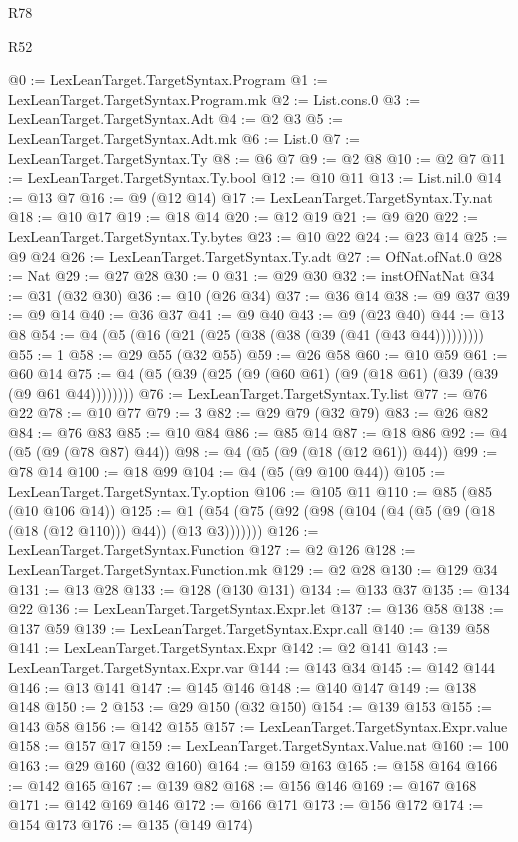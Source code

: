 \begin{lexlean}{R78}
\begin{lexlean}{R52}
\begin{coremodule}
{{{{{{{{{{{{{{{{{{{{{{{{{{{{{{{{{{{{{{{{{{{{{{{{{{{{{{{{{{{{{{{{{{{{{{{{{{{{{{{{{{{{{{{{{{{{{{{{{{{{{{{{{{{{{{{{{{{{{{{{{{{{{{{{{{{{{{{{{{{{{{{{{{{{{{{{{{{{{{{{{{{{{{{{{{{{{{{{{{{{{{{{{{{{{{{{{{{{{{@0 := LexLeanTarget.TargetSyntax.Program
@1 := LexLeanTarget.TargetSyntax.Program.mk
@2 := List.cons.{0}
@3 := LexLeanTarget.TargetSyntax.Adt
@4 := @2 @3
@5 := LexLeanTarget.TargetSyntax.Adt.mk
@6 := List.{0}
@7 := LexLeanTarget.TargetSyntax.Ty
@8 := @6 @7
@9 := @2 @8
@10 := @2 @7
@11 := LexLeanTarget.TargetSyntax.Ty.bool
@12 := @10 @11
@13 := List.nil.{0}
@14 := @13 @7
@16 := @9 (@12 @14)
@17 := LexLeanTarget.TargetSyntax.Ty.nat
@18 := @10 @17
@19 := @18 @14
@20 := @12 @19
@21 := @9 @20
@22 := LexLeanTarget.TargetSyntax.Ty.bytes
@23 := @10 @22
@24 := @23 @14
@25 := @9 @24
@26 := LexLeanTarget.TargetSyntax.Ty.adt
@27 := OfNat.ofNat.{0}
@28 := Nat
@29 := @27 @28
@30 := 0
@31 := @29 @30
@32 := instOfNatNat
@34 := @31 (@32 @30)
@36 := @10 (@26 @34)
@37 := @36 @14
@38 := @9 @37
@39 := @9 @14
@40 := @36 @37
@41 := @9 @40
@43 := @9 (@23 @40)
@44 := @13 @8
@54 := @4 (@5 (@16 (@21 (@25 (@38 (@38 (@39 (@41 (@43 @44)))))))))
@55 := 1
@58 := @29 @55 (@32 @55)
@59 := @26 @58
@60 := @10 @59
@61 := @60 @14
@75 := @4 (@5 (@39 (@25 (@9 (@60 @61) (@9 (@18 @61) (@39 (@39 (@9 @61 @44))))))))
@76 := LexLeanTarget.TargetSyntax.Ty.list
@77 := @76 @22
@78 := @10 @77
@79 := 3
@82 := @29 @79 (@32 @79)
@83 := @26 @82
@84 := @76 @83
@85 := @10 @84
@86 := @85 @14
@87 := @18 @86
@92 := @4 (@5 (@9 (@78 @87) @44))
@98 := @4 (@5 (@9 (@18 (@12 @61)) @44))
@99 := @78 @14
@100 := @18 @99
@104 := @4 (@5 (@9 @100 @44))
@105 := LexLeanTarget.TargetSyntax.Ty.option
@106 := @105 @11
@110 := @85 (@85 (@10 @106 @14))
@125 := @1 (@54 (@75 (@92 (@98 (@104 (@4 (@5 (@9 (@18 (@18 (@12 @110))) @44)) (@13 @3)))))))
@126 := LexLeanTarget.TargetSyntax.Function
@127 := @2 @126
@128 := LexLeanTarget.TargetSyntax.Function.mk
@129 := @2 @28
@130 := @129 @34
@131 := @13 @28
@133 := @128 (@130 @131)
@134 := @133 @37
@135 := @134 @22
@136 := LexLeanTarget.TargetSyntax.Expr.let
@137 := @136 @58
@138 := @137 @59
@139 := LexLeanTarget.TargetSyntax.Expr.call
@140 := @139 @58
@141 := LexLeanTarget.TargetSyntax.Expr
@142 := @2 @141
@143 := LexLeanTarget.TargetSyntax.Expr.var
@144 := @143 @34
@145 := @142 @144
@146 := @13 @141
@147 := @145 @146
@148 := @140 @147
@149 := @138 @148
@150 := 2
@153 := @29 @150 (@32 @150)
@154 := @139 @153
@155 := @143 @58
@156 := @142 @155
@157 := LexLeanTarget.TargetSyntax.Expr.value
@158 := @157 @17
@159 := LexLeanTarget.TargetSyntax.Value.nat
@160 := 100
@163 := @29 @160 (@32 @160)
@164 := @159 @163
@165 := @158 @164
@166 := @142 @165
@167 := @139 @82
@168 := @156 @146
@169 := @167 @168
@171 := @142 @169 @146
@172 := @166 @171
@173 := @156 @172
@174 := @154 @173
@176 := @135 (@149 @174)
}}}}}}}}}}}}}}}}}}}}}}}}}}}}}}}}}}}}}}}}}}}}}}}}}}}}}}}}}}}}}}}}}}}}}}}}}}}}}}}}}}}}}}}}}}}}}}}}}}}}}}}}}}}}}}}}}}}}}}}}}}}}}}}}}}}}}}}}}}}}}}}}}}}}}}}}}}}}}}}}}}}}}}}}}}}}}}}}}}}}}}}}}}}}}}}}}}}}}}
\end{coremodule}
\end{lexlean}
\end{lexlean}

